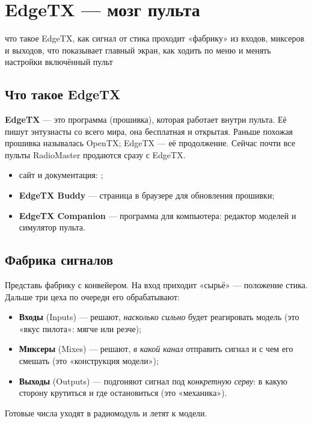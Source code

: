 \chapter{EdgeTX --- мозг пульта}
\label{ch:edgetx}
\chapterintro
  {что такое EdgeTX, как сигнал от стика проходит «фабрику» из входов, миксеров и выходов,
   что показывает главный экран, как ходить по меню и менять настройки}
  {включённый пульт}

\section{Что такое EdgeTX}

\textbf{EdgeTX} --- это программа (прошивка), которая работает внутри пульта. Её пишут
энтузиасты со всего мира, она бесплатная и открытая. Раньше похожая прошивка называлась
OpenTX; EdgeTX --- её продолжение. Сейчас почти все пульты RadioMaster продаются сразу с EdgeTX.

\begin{itemize}
  \item сайт и документация: ;
  \item \textbf{EdgeTX Buddy} --- страница в браузере для обновления прошивки;
  \item \textbf{EdgeTX Companion} --- программа для компьютера: редактор моделей и симулятор пульта.
\end{itemize}

\section{Фабрика сигналов}

\begin{simple}
Представь фабрику с конвейером. На вход приходит «сырьё» --- положение стика. Дальше
три цеха по очереди его обрабатывают:
\begin{itemize}
  \item \textbf{Входы} (Inputs) --- решают, \emph{насколько сильно} будет реагировать модель
        (это «вкус пилота»: мягче или резче);
  \item \textbf{Миксеры} (Mixes) --- решают, \emph{в какой канал} отправить сигнал и с чем его
        смешать (это «конструкция модели»);
  \item \textbf{Выходы} (Outputs) --- подгоняют сигнал под \emph{конкретную серву}:
        в какую сторону крутиться и где остановиться (это «механика»).
\end{itemize}
Готовые числа уходят в радиомодуль и летят к модели.
\end{simple}

